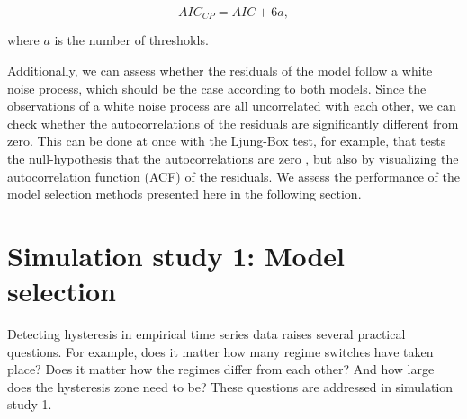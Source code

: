 \documentclass{article}
\begin{document}
\begin{equation}
\label{eq:aiccp}
AIC_{CP} = AIC + 6a,
\end{equation}

\noindent where $a$ is the number of thresholds.

Additionally, we can assess whether the residuals of the model follow a white noise process, which should be the case according to both models.
Since the observations of a white noise process are all uncorrelated with each other, we can check whether the autocorrelations of the residuals are significantly different from zero.
This can be done at once with the Ljung-Box test, for example, that tests the null-hypothesis that the autocorrelations are zero \citep{ljungbox}, but also by visualizing the autocorrelation function (ACF) of the residuals.
We assess the performance of the model selection methods presented here in the following section.

\section{Simulation study 1: Model selection}
\label{sec:simulation_study_1}
Detecting hysteresis in empirical time series data raises several practical questions.
For example, does it matter how many regime switches have taken place?
Does it matter how the regimes differ from each other?
And how large does the hysteresis zone need to be?
These questions are addressed in simulation study 1.
\end{document}
